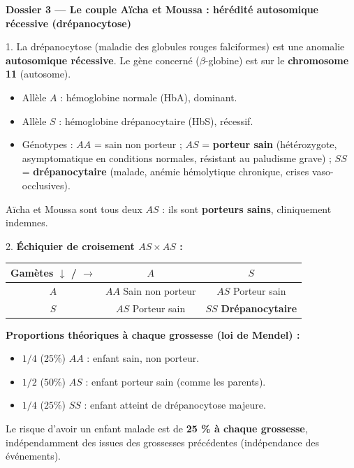 \documentclass[11pt]{article}
\begin{document}
\begin{exoresolu}
\tcblower

\textbf{Dossier 3 — Le couple Aïcha et Moussa : hérédité autosomique récessive (drépanocytose)}

1. La drépanocytose (maladie des globules rouges falciformes) est une anomalie \textbf{autosomique récessive}. Le gène concerné ($\beta$-globine) est sur le \textbf{chromosome 11} (autosome).
\begin{itemize}
    \item Allèle $A$ : hémoglobine normale (HbA), dominant.
    \item Allèle $S$ : hémoglobine drépanocytaire (HbS), récessif.
    \item Génotypes : $AA$ = sain non porteur ; $AS$ = \textbf{porteur sain} (hétérozygote, asymptomatique en conditions normales, résistant au paludisme grave) ; $SS$ = \textbf{drépanocytaire} (malade, anémie hémolytique chronique, crises vaso-occlusives).
\end{itemize}
Aïcha et Moussa sont tous deux $AS$ : ils sont \textbf{porteurs sains}, cliniquement indemnes.

2. \textbf{Échiquier de croisement $AS \times AS$ :}

\begin{center}
\begin{tabular}{|c|c|c|}
\hline
\rowcolor{popblueL} \textbf{Gamètes $\downarrow$ / $\rightarrow$} & \textbf{$A$} & \textbf{$S$} \\
\hline
\textbf{$A$} & $AA$ \newline Sain non porteur & $AS$ \newline Porteur sain \\
\hline
\textbf{$S$} & $AS$ \newline Porteur sain & $SS$ \newline \textbf{Drépanocytaire} \\
\hline
\end{tabular}
\end{center}

\textbf{Proportions théoriques à chaque grossesse (loi de Mendel) :}
\begin{itemize}
    \item $1/4$ ($25\%$) $AA$ : enfant sain, non porteur.
    \item $1/2$ ($50\%$) $AS$ : enfant porteur sain (comme les parents).
    \item $1/4$ ($25\%$) $SS$ : enfant atteint de drépanocytose majeure.
\end{itemize}
Le risque d'avoir un enfant malade est de \textbf{25 \% à chaque grossesse}, indépendamment des issues des grossesses précédentes (indépendance des événements).


\end{exoresolu}
\end{document}
